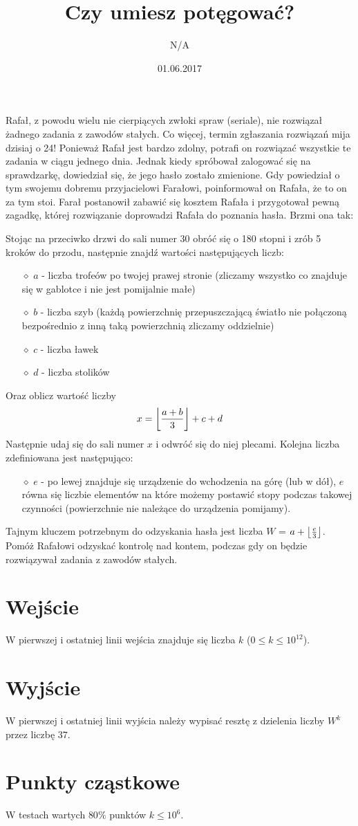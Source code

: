 \documentclass[zad,zawodnik,utf8]{sinol}
\title{Czy umiesz potęgować?}
\author{N/A} %
\date{01.06.2017}
\DeclarePairedDelimiter\floor{\lfloor}{\rfloor}
\begin{document}
\begin{tasktext}

	Rafał, z powodu wielu nie cierpiących zwłoki spraw (seriale), nie rozwiązał żadnego zadania z zawodów stałych. Co więcej, termin zgłaszania
rozwiązań mija dzisiaj o 24! Ponieważ Rafał jest bardzo zdolny, potrafi on rozwiązać wszystkie te zadania w ciągu jednego dnia. Jednak kiedy spróbował zalogować się na sprawdzarkę, dowiedział się, że jego hasło zostało zmienione. Gdy powiedział o tym swojemu dobremu przyjacielowi Farałowi, poinformował on Rafała, że to on za tym stoi. Farał postanowił zabawić się kosztem Rafała i przygotował pewną zagadkę, której rozwiązanie doprowadzi Rafała do poznania hasła. Brzmi ona tak:

Stojąc na przeciwko drzwi do sali numer 30 obróć się o 180 stopni i zrób 5 kroków do przodu, następnie znajdź wartości następujących liczb:
	\begin{itemize}
		\item[$\diamond$] $a$ - liczba trofeów po twojej prawej stronie (zliczamy wszystko co znajduje się w gablotce i nie jest pomijalnie małe)
		\item[$\diamond$] $b$ - liczba szyb (każdą powierzchnię przepuszczającą światło nie połączoną bezpośrednio z inną taką powierzchnią zliczamy oddzielnie)
		\item[$\diamond$] $c$ - liczba ławek
		\item[$\diamond$] $d$ - liczba stolików
	\end{itemize}
Oraz oblicz wartość liczby 
 \begin{equation*}
     x = \floor*{\frac{a+b}{3}} + c + d
 \end{equation*}
Następnie udaj się do sali numer $x$ i odwróć się do niej plecami. Kolejna liczba zdefiniowana jest następująco:
	\begin{itemize}
		\item[$\diamond$] $e$ - po lewej znajduje się urządzenie do wchodzenia na górę (lub w dół), $e$ równa się liczbie elementów na które możemy postawić stopy podczas takowej czynności (powierzchnie nie należące do urządzenia pomijamy).
	\end{itemize}
Tajnym kluczem potrzebnym do odzyskania hasła jest liczba $W$ = $a + \floor*{\frac{e}{3}}$. Pomóż Rafałowi odzyskać kontrolę nad kontem, podczas gdy on będzie rozwiązywał zadania z zawodów stałych.

  	\section{Wejście}
W pierwszej i ostatniej linii wejścia znajduje się liczba $k$ ($0 \leq k \leq 10^{12}$).
	\section{Wyjście}
W pierwszej i ostatniej linii wyjścia należy wypisać resztę z dzielenia liczby $W^{k}$ przez liczbę $37$.
	\makecompactexample
	\section{Punkty cząstkowe}
	W testach wartych $80\%$ punktów $k \leq 10^6$.

\end{tasktext}
\end{document}
